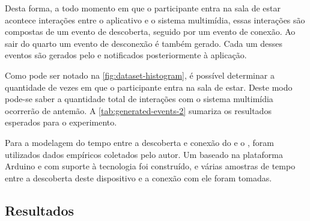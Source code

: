 Desta forma, a todo momento em que o participante entra na sala de estar acontece interações entre o aplicativo e o sistema multimídia, essas interações são compostas de um evento de descoberta, seguido por um evento de conexão.
Ao sair do quarto um evento de desconexão é também gerado. Cada um desses eventos são gerados pelo \stwopa e notificados posteriormente à aplicação.

Como pode ser notado na \autoref{fig:dataset-histogram}, é possível determinar a quantidade de vezes em que o participante entra na sala de estar.
Deste modo pode-se saber a quantidade total de interações com o sistema multimídia ocorrerão de antemão.
A \autoref{tab:generated-events-2} sumariza os resultados esperados para o experimento.

\begin{table}[htb]
	\begin{center}
	\end{center}
\end{table}

Para a modelagem do tempo entre a descoberta e conexão do \smartphone e o \smartobj, foram utilizados dados empíricos coletados pelo autor.
Um \smartobj baseado na plataforma Arduino e com suporte à tecnologia \ble foi construído, e várias amostras de tempo entre a descoberta deste dispositivo e a conexão com ele foram tomadas.

\subsection{Resultados}

\vphantom{abc}

